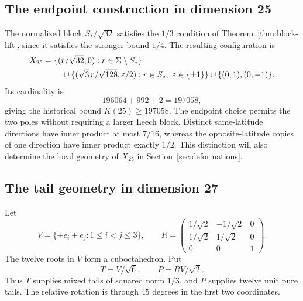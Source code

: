 \subsection{The endpoint construction in dimension 25}
The normalized block $S_*/\sqrt{32}$ satisfies the $1/3$ condition of
Theorem~\ref{thm:block-lift}, since it satisfies the stronger bound $1/4$.
The resulting configuration is
\begin{align}
 X_{25}={}&\{(r/\sqrt{32},0):r\in\Sigma\setminus S_*\}\nonumber\\
 &\quad\cup\{(\sqrt3\,r/\sqrt{128},\varepsilon/2):
                   r\in S_*,\ \varepsilon\in\{\pm1\}\}
       \cup\{(0,1),(0,-1)\}.\label{eq:d25}
\end{align}
Its cardinality is
\[
 196064+992+2=197058,
\]
giving the historical bound $K(25)\ge197058$.
The endpoint choice permits the two poles without requiring a larger
Leech block. Distinct same-latitude directions have inner product at
most $7/16$, whereas the opposite-latitude copies of one direction
have inner product exactly $1/2$. This distinction will also determine
the local geometry of $X_{25}$ in Section~\ref{sec:deformations}.

\subsection{The tail geometry in dimension 27}
Let
\begin{equation}\label{eq:D3}
 V=\{\pm e_i\pm e_j:1\le i<j\le3\},\qquad
 R=\begin{pmatrix}
  1/\sqrt2&-1/\sqrt2&0\\
  1/\sqrt2&1/\sqrt2&0\\
  0&0&1
 \end{pmatrix}.
\end{equation}
The twelve roots in $V$ form a cuboctahedron. Put
\begin{equation}\label{eq:tailsets}
 T=V/\sqrt6,\qquad P=RV/\sqrt2.
\end{equation}
Thus $T$ supplies mixed tails of squared norm $1/3$, and $P$ supplies
twelve unit pure tails. The relative rotation is through $45$ degrees
in the first two coordinates.

